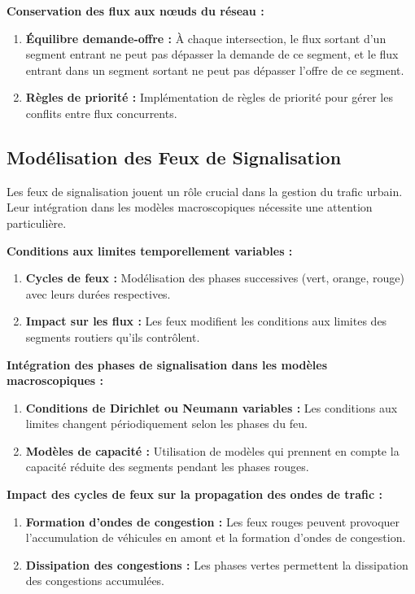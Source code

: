 \textbf{Conservation des flux aux nœuds du réseau :}

\begin{enumerate}
    \item \textbf{Équilibre demande-offre :} À chaque intersection, le flux sortant d'un segment entrant ne peut pas dépasser la demande de ce segment, et le flux entrant dans un segment sortant ne peut pas dépasser l'offre de ce segment.
    \item \textbf{Règles de priorité :} Implémentation de règles de priorité pour gérer les conflits entre flux concurrents.
\end{enumerate}

\subsection{Modélisation des Feux de Signalisation}
Les feux de signalisation jouent un rôle crucial dans la gestion du trafic urbain. Leur intégration dans les modèles macroscopiques nécessite une attention particulière.

\textbf{Conditions aux limites temporellement variables :}

\begin{enumerate}
    \item \textbf{Cycles de feux :} Modélisation des phases successives (vert, orange, rouge) avec leurs durées respectives.
    \item \textbf{Impact sur les flux :} Les feux modifient les conditions aux limites des segments routiers qu'ils contrôlent.
\end{enumerate}

\textbf{Intégration des phases de signalisation dans les modèles macroscopiques :}

\begin{enumerate}
    \item \textbf{Conditions de Dirichlet ou Neumann variables :} Les conditions aux limites changent périodiquement selon les phases du feu.
    \item \textbf{Modèles de capacité :} Utilisation de modèles qui prennent en compte la capacité réduite des segments pendant les phases rouges.
\end{enumerate}

\textbf{Impact des cycles de feux sur la propagation des ondes de trafic :}

\begin{enumerate}
    \item \textbf{Formation d'ondes de congestion :} Les feux rouges peuvent provoquer l'accumulation de véhicules en amont et la formation d'ondes de congestion.
    \item \textbf{Dissipation des congestions :} Les phases vertes permettent la dissipation des congestions accumulées.
\end{enumerate}

